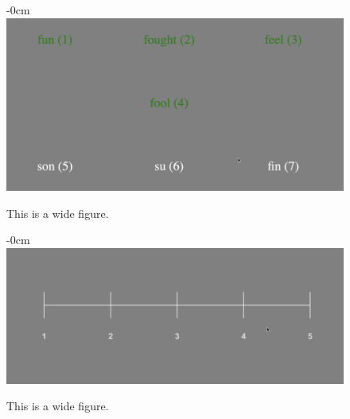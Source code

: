 \documentclass[preprints]{Definitions/mdpi}
\begin{document}
\begin{figure}[H]
\begin{adjustwidth}{-\extralength}{0cm}
\centering
\includegraphics[width=13.5cm]{figs/vct.png}
\end{adjustwidth}
\caption{This is a wide figure.\label{vct}}
\end{figure}

\begin{figure}[H]
\begin{adjustwidth}{-\extralength}{0cm}
\centering
\includegraphics[width=13.5cm]{figs/likert.png}
\end{adjustwidth}
\caption{This is a wide figure.\label{likert}}
\end{figure}
\end{document}
